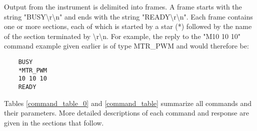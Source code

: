 \documentclass{article}
\begin{document}
Output from the instrument is delimited into frames.
A frame starts with the string "BUSY{\textbackslash}r{\textbackslash}n" and ends with the string "READY{\textbackslash}r{\textbackslash}n".
Each frame contains one or more sections, each of which is started by a star (*) followed by the name of the section terminated by {\textbackslash}r{\textbackslash}n.
For example, the reply to the "M10 10 10" command example given earlier is of type MTR\_PWM and would therefore be:

\begin{lstlisting}
    BUSY
    *MTR_PWM
    10 10 10
    READY
\end{lstlisting}

Tables \ref{command_table_0} and \ref{command_table} summarize all commands and their parameters.
More detailed descriptions of each command and response are given in the sections that follow.

\end{document}

